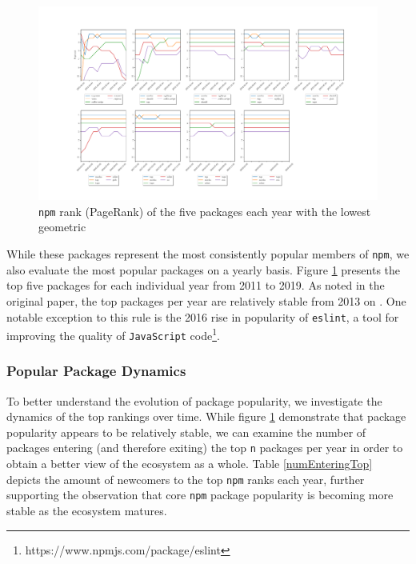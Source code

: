 \documentclass[10pt,conference]{IEEEtran}
\def\code#1{\texttt{#1}}
\begin{document}
\begin{figure}
  \includegraphics[width=1\textwidth]{figures/highest_ranked.pdf}
  \caption{\code{npm} rank (PageRank) of the five packages each year with the lowest geometric}
  \label{ranksByYear}
\end{figure}

While these packages represent the most consistently popular
members of \code{npm}, we also evaluate the most popular packages
on a yearly basis. Figure \ref{ranksByYear} presents the top five packages
for each individual year from 2011 to 2019. As noted in the original paper,
the top packages per year are relatively stable from 2013 on \cite{Wittern:2016}.
One notable exception to this rule is the 2016 rise in popularity of \code{eslint},
a tool for improving the quality of \code{JavaScript} code\footnote{https://www.npmjs.com/package/eslint}.


\subsubsection{Popular Package Dynamics}

To better understand the evolution of package popularity,
we investigate the dynamics of the top rankings over time.
While figure \ref{ranksByYear} demonstrate that package popularity
appears to be relatively stable, we can examine the number of packages
entering (and therefore exiting) the top \code{n} packages per year in
order to obtain a better view of the ecosystem as a whole.
Table \ref{numEnteringTop} depicts the amount of newcomers to the top
\code{npm} ranks each year, further supporting the observation that
core \code{npm} package popularity is becoming more stable as the 
ecosystem matures.
\end{document}
